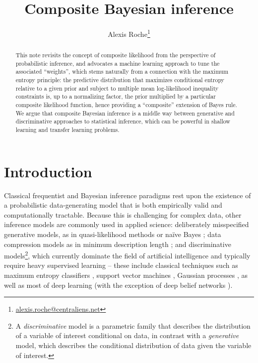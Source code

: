 \documentclass[english]{scrartcl}
\title{Composite Bayesian inference}
\date{}
\author{Alexis Roche\thanks{\url{alexis.roche@centraliens.net}}}
\begin{document}
\maketitle

\begin{abstract}
This note revisits the concept of composite likelihood from the perspective of probabilistic inference, and advocates a machine learning approach to tune the associated ``weights'', which stems naturally from a connection with the maximum entropy principle: the predictive distribution that maximizes conditional entropy relative to a given prior and subject to multiple mean log-likelihood inequality constraints is, up to a normalizing factor, the prior multiplied by a particular composite likelihood function, hence providing a ``composite'' extension of Bayes rule. We argue that composite Bayesian inference is a middle way between generative and discriminative approaches to statistical inference, which can be powerful in shallow learning and transfer learning problems.
\end{abstract}


\section{Introduction}
\label{sec:intro}

Classical frequentist and Bayesian inference paradigms rest upon the existence of a probabilistic data-generating model that is both empirically valid and computationally tractable. Because this is challenging for complex data, other inference models are commonly used in applied science: deliberately misspecified generative models, as in quasi-likelihood methods \cite{White-82,Walker-13} or na\"ive Bayes \cite{Ng-01}; data compression models as in minimum description length \cite{Grunwald-07}; and discriminative models\footnote{A {\em discriminative} model is a parametric family that describes the distribution of a variable of interest conditional on data, in contrast with a {\em generative} model, which describes the conditional distribution of data given the variable of interest.}, which currently dominate the field of artificial intelligence and typically require heavy supervised learning -- these include classical techniques such as maximum entropy classifiers \cite{BergerA-96}, support vector machines \cite{Vapnik-00}, Gaussian processes \cite{Rasmussen-06}, as well as most of deep learning \cite{Lecun-15,Goodfellow-16} (with the exception of deep belief networks \cite{Hinton-06,Fischer-14}). 
\end{document}
